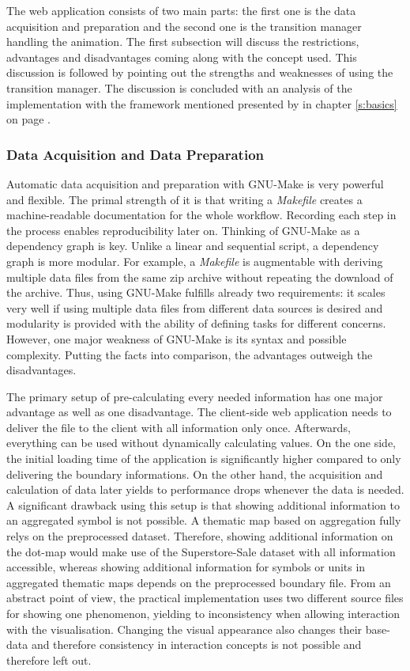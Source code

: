 The web application consists of two main parts: the first one is the data acquisition and preparation and the second one is the transition manager handling the animation. The first subsection will discuss the restrictions, advantages and disadvantages coming along with the concept used. This discussion is followed by pointing out the strengths and weaknesses of using the transition manager. The discussion is concluded with an analysis of the implementation with the framework mentioned presented by \citeauthor{Munzner2014} in chapter \ref{s:basics} on page \pageref{s:basics}.

\subsubsection{Data Acquisition and Data Preparation}
Automatic data acquisition and preparation with GNU-Make is very powerful and flexible. The primal strength of it is that writing a \textit{Makefile} creates a machine-readable documentation for the whole workflow. Recording each step in the process enables reproducibility later on.
Thinking of GNU-Make as a dependency graph is key. Unlike a linear and sequential script, a dependency graph is more modular. For example, a \textit{Makefile} is augmentable with deriving multiple data files from the same zip archive without repeating the download of the archive. Thus, using GNU-Make fulfills already two requirements: it scales very well if using multiple data files from different data sources is desired and modularity is provided with the ability of defining tasks for different concerns. However, one major weakness of GNU-Make is its syntax and possible complexity. Putting the facts into comparison, the advantages outweigh the disadvantages.

The primary setup of pre-calculating every needed information has one major advantage as well as one disadvantage. The client-side web application needs to deliver the file to the client with all information only once. Afterwards, everything can be used without dynamically calculating values. On the one side, the initial loading time of the application is significantly higher compared to only delivering the boundary informations. On the other hand, the acquisition and calculation of data later yields to performance drops whenever the data is needed.
A significant drawback using this setup is that showing additional information to an aggregated symbol is not possible. A thematic map based on aggregation fully relys on the preprocessed dataset. Therefore, showing additional information on the dot-map would make use of the Superstore-Sale dataset with all information accessible, whereas showing additional information for symbols or units in aggregated thematic maps depends on the preprocessed boundary file. From an abstract point of view, the practical implementation uses two different source files for showing one phenomenon, yielding to inconsistency when allowing interaction with the visualisation. Changing the visual appearance also changes their base-data and therefore consistency in interaction concepts is not possible and therefore left out.


